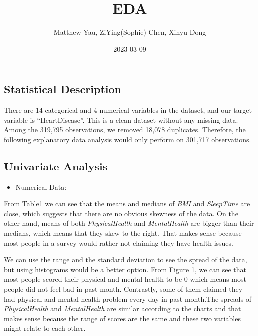 \documentclass[
  11pt,
]{article}
\title{EDA}
\author{Matthew Yau, ZiYing(Sophie) Chen, Xinyu Dong}
\date{2023-03-09}
\providecommand{\tightlist}{%
  \setlength{\itemsep}{0pt}\setlength{\parskip}{0pt}}
\begin{document}
\maketitle

\hypertarget{statistical-description}{%
\subsection{Statistical Description}\label{statistical-description}}

There are 14 categorical and 4 numerical variables in the dataset, and
our target variable is ``HeartDisease''. This is a clean dataset without
any missing data. Among the 319,795 observations, we removed 18,078
duplicates. Therefore, the following explanatory data analysis would
only perform on 301,717 observations.

\hypertarget{univariate-analysis}{%
\subsection{Univariate Analysis}\label{univariate-analysis}}

\begin{itemize}
\tightlist
\item
  Numerical Data:
\end{itemize}

From Table1 we can see that the means and medians of \emph{BMI} and
\emph{SleepTime} are close, which suggests that there are no obvious
skewness of the data. On the other hand, means of both
\emph{PhysicalHealth} and \emph{MentalHealth} are bigger than their
medians, which means that they skew to the right. That makes sense
because most people in a survey would rather not claiming they have
health issues.

We can use the range and the standard deviation to see the spread of the
data, but using histograms would be a better option. From Figure 1, we
can see that most people scored their physical and mental health to be 0
which means most people did not feel bad in past month. Contrastly, some
of them claimed they had physical and mental health problem every day in
past month.The spreads of \emph{PhysicalHealth} and \emph{MentalHealth}
are similar according to the charts and that makes sense because the
range of scores are the same and these two variables might relate to
each other.
\end{document}
